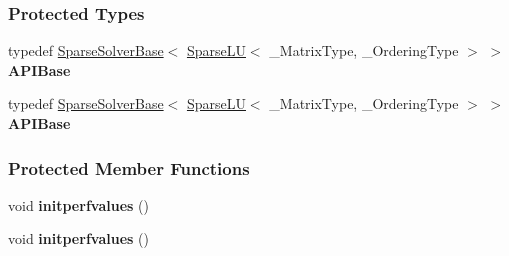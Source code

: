 \subsubsection*{Protected Types}
\begin{DoxyCompactItemize}
\item 
\mbox{\label{group___sparse_l_u___module_a9c28d06780ee2dbddcdab9861ec63c22}} 
typedef \hyperlink{group___sparse_core___module_class_eigen_1_1_sparse_solver_base}{Sparse\+Solver\+Base}$<$ \hyperlink{group___sparse_l_u___module_class_eigen_1_1_sparse_l_u}{Sparse\+LU}$<$ \+\_\+\+Matrix\+Type, \+\_\+\+Ordering\+Type $>$ $>$ {\bfseries A\+P\+I\+Base}
\item 
\mbox{\label{group___sparse_l_u___module_a9c28d06780ee2dbddcdab9861ec63c22}} 
typedef \hyperlink{group___sparse_core___module_class_eigen_1_1_sparse_solver_base}{Sparse\+Solver\+Base}$<$ \hyperlink{group___sparse_l_u___module_class_eigen_1_1_sparse_l_u}{Sparse\+LU}$<$ \+\_\+\+Matrix\+Type, \+\_\+\+Ordering\+Type $>$ $>$ {\bfseries A\+P\+I\+Base}
\end{DoxyCompactItemize}
\subsubsection*{Protected Member Functions}
\begin{DoxyCompactItemize}
\item 
\mbox{\label{group___sparse_l_u___module_a38372b5d6f461e3a92fc7c8fb621b730}} 
void {\bfseries initperfvalues} ()
\item 
\mbox{\label{group___sparse_l_u___module_a38372b5d6f461e3a92fc7c8fb621b730}} 
void {\bfseries initperfvalues} ()
\end{DoxyCompactItemize}
